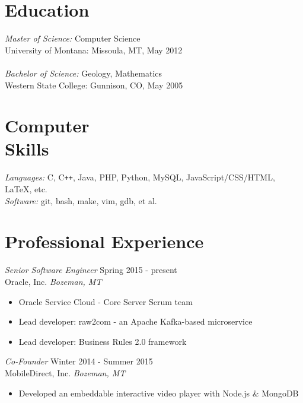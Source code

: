 \documentclass[line,margin]{res}
\begin{document}
\address{\texttt{perry@rphv.net} | 406.848.1774  }
\address{219 S. Bozeman Ave, Bozeman, MT 59715}
 
\begin{resume}
 
\section{\sc Education} 
        {\sl Master of Science:} Computer Science\\
        University of Montana: Missoula, MT, May 2012\\
        \\
        {\sl Bachelor of Science:} Geology, Mathematics \\
        Western State College: Gunnison, CO, May 2005 \\
 
\section{\sc Computer \\ Skills}
        {\sl Languages:} C, C\verb!++!, Java, PHP, Python, MySQL, JavaScript/CSS/HTML, \LaTeX, etc.\\
        {\sl Software:} git, bash, make, vim, gdb, et al.\\


\section{\sc Professional Experience} 
        {\sl Senior Software Engineer} \hfill  Spring 2015 - present\\
        Oracle, Inc. \hfill {\sl Bozeman, MT}
        \begin{itemize} \itemsep -2pt
            \item Oracle Service Cloud - Core Server Scrum team 
            \item Lead developer: raw2com - an  Apache Kafka-based microservice 
            \item Lead developer: Business Rules 2.0 framework
        \end{itemize}

        {\sl Co-Founder} \hfill  Winter 2014 - Summer 2015\\
        MobileDirect, Inc. \hfill {\sl Bozeman, MT}
        \begin{itemize} \itemsep -2pt
            \item Developed an embeddable interactive video player with Node.js \& MongoDB
        \end{itemize}


\end{resume}
\end{document}
